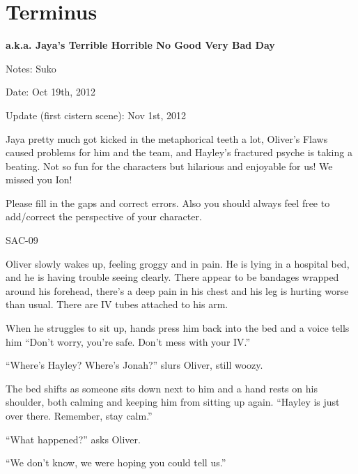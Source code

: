 \setcounter{chapter}{ 7 }
\chapter{\textbf{Terminus} }




\begin{center}
 {\LARGE \textbf{a.k.a. Jaya's Terrible Horrible No Good Very Bad Day} } 
\end{center}




Notes: Suko

Date: Oct 19th, 2012

Update (first cistern scene): Nov 1st, 2012



Jaya pretty much got kicked in the metaphorical teeth a lot, Oliver's Flaws caused problems for him and the team, and Hayley's fractured psyche is taking a beating.  Not so fun for the characters but hilarious and enjoyable for us!  We missed you Ion!



Please fill in the gaps and correct errors.  Also you should always feel free to add/correct the perspective of your character.



\noindent\hrulefill





 {\LARGE SAC-09 } 



Oliver slowly wakes up, feeling groggy and in pain.  He is lying in a hospital bed, and he is having trouble seeing clearly.  There appear to be bandages wrapped around his forehead, there's a deep pain in his chest and his leg is hurting worse than usual.  There are IV tubes attached to his arm.



When he struggles to sit up, hands press him back into the bed and a voice tells him ``Don't worry, you're safe.  Don't mess with your IV.''

``Where's Hayley?  Where's Jonah?'' slurs Oliver, still woozy.

The bed shifts as someone sits down next to him and a hand rests on his shoulder, both calming and keeping him from sitting up again.  ``Hayley is just over there.  Remember, stay calm.''

``What happened?'' asks Oliver.

``We don't know, we were hoping you could tell us.''



